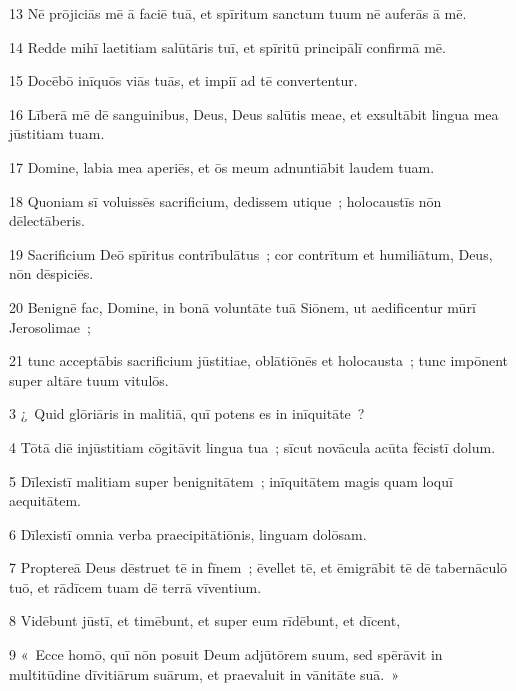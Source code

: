 \psalmVerse
  {\phantom{0}13}
  {Nē prōjiciās mē ā faciē tuā, et spīritum sanctum tuum nē auferās ā mē.}


\psalmVerse
  {\phantom{0}14}
  {Redde mihī laetitiam salūtāris tuī, et spīritū principālī confirmā mē.}


\psalmVerse
  {\phantom{0}15}
  {Docēbō inīquōs viās tuās, et impiī ad tē convertentur.}


\psalmVerse
  {\phantom{0}16}
  {Līberā mē dē sanguinibus, Deus, Deus salūtis meae, et exsultābit lingua mea jūstitiam tuam.}


\psalmVerse
  {\phantom{0}17}
  {Domine, labia mea aperiēs, et ōs meum adnuntiābit laudem tuam.}


\psalmVerse
  {\phantom{0}18}
  {Quoniam sī voluissēs sacrificium, dedissem utique~; holocaustīs nōn dēlectāberis.}


\psalmVerse
  {\phantom{0}19}
  {Sacrificium Deō spīritus contrībulātus~; cor contrītum et humiliātum, Deus, nōn dēspiciēs.}


\psalmVerse
  {\phantom{0}20}
  {Benignē fac, Domine, in bonā voluntāte tuā Siōnem, ut aedificentur mūrī Jerosolimae~;}


\psalmVerse
  {\phantom{0}21}
  {tunc acceptābis sacrificium jūstitiae, oblātiōnēs et holocausta~; tunc impōnent super altāre tuum vitulōs.}




\psalmVerse
  {\phantom{00}3}
  {¿~Quid glōriāris in malitiā, quī potens es in inīquitāte~?}


\psalmVerse
  {\phantom{00}4}
  {Tōtā diē injūstitiam cōgitāvit lingua tua~; sīcut novācula acūta fēcistī dolum.}


\psalmVerse
  {\phantom{00}5}
  {Dīlexistī malitiam super benignitātem~; inīquitātem magis quam loquī aequitātem.}


\psalmVerse
  {\phantom{00}6}
  {Dīlexistī omnia verba praecipitātiōnis, linguam dolōsam.}


\psalmVerse
  {\phantom{00}7}
  {Proptereā Deus dēstruet tē in fīnem~; ēvellet tē, et ēmigrābit tē dē tabernāculō tuō, et rādīcem tuam dē terrā vīventium.}


\psalmVerse
  {\phantom{00}8}
  {Vidēbunt jūstī, et timēbunt, et super eum rīdēbunt, et dīcent,}


\psalmVerse
  {\phantom{00}9}
  {«~Ecce homō, quī nōn posuit Deum adjūtōrem suum, sed spērāvit in multitūdine dīvitiārum suārum, et praevaluit in vānitāte suā.~»}



